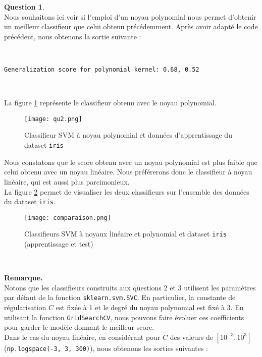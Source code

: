 \documentclass[11pt,a4paper]{article}
\theoremstyle{definition}
\newtheorem{Qu}{Question}
\begin{document}
\begin{Qu}~\\

Nous souhaitons ici voir si l'emploi d'un noyau polynomial nous permet d'obtenir un meilleur classifieur que celui obtenu précédemment. Après avoir adapté le code précédent, nous obtenons la sortie suivante :

\

\texttt{Generalization score for polynomial kernel: 0.68, 0.52 }

\

La figure \ref{qu2} représente le classifieur obtenu avec le noyau polynomial.

\begin{figure}[h!]\centering
\texttt{[image: qu2.png]}
\caption{Classifieur SVM à noyau polynomial et données d'apprentissage du dataset \texttt{iris}}
\label{qu2}
\end{figure}


Nous constatons que le score obtenu avec un noyau polynomial est plus faible que celui obtenu avec un noyau linéaire. Nous préférerons donc le classifieur à noyau linéaire, qui est aussi plus parcimonieux. \\
 La figure \ref{comp} permet de visualiser  les deux classifieurs sur l'ensemble des données du dataset \texttt{iris}. 
 
\begin{figure}[h!]\centering
\texttt{[image: comparaison.png]}
\caption{Classifieurs SVM à noyaux linéaire et polynomial et dataset \texttt{iris} (apprentissage et test)}
\label{comp}
\end{figure}
 
\end{Qu}

\

\textbf{Remarque.}\\

Notons que les classifieurs construits aux questions 2 et 3 utilisent les paramètres par défaut de la fonction \texttt{sklearn.svm.SVC}. En particulier, la constante de régularisation $C$ est fixée à 1 et  le degré du noyau polynomial est fixé à 3.  En utilisant la fonction \texttt{GridSearchCV}, nous pouvons faire évoluer ces coefficients pour garder le modèle donnant le meilleur score. \\
Dans le cas du noyau linéaire, en considérant pour $C$ des valeurs de $[10^{-3},10^{3}]$ (\texttt{np.logspace(-3, 3, 300)}), nous obtenons les sorties suivantes :
\end{document}
